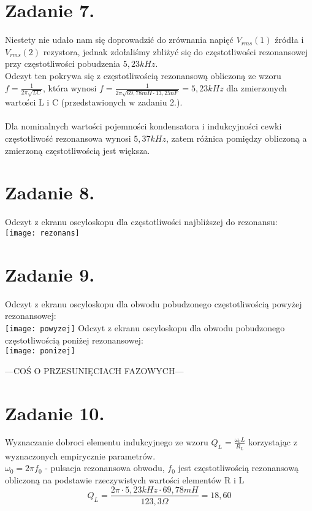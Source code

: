 \documentclass[polish,a4paper]{article}
\begin{document}
\section{Zadanie 7.}
Niestety nie udało nam się doprowadzić do zrównania napięć $V_{rms}(1)$ źródła i $V_{rms}(2)$ rezystora, jednak zdołaliśmy zbliżyć się do częstotliwości rezonansowej przy częstotliwości pobudzenia $5,23kHz$.\\
Odczyt ten pokrywa się z częstotliwością rezonansową obliczoną ze wzoru $f=\frac{1}{2\pi\sqrt{LC}}$, która wynosi $f=\frac{1}{2\pi\sqrt{69,78mH\cdot13,25nF}} = 5,23kHz$ dla zmierzonych wartości L i C (przedstawionych w zadaniu 2.). \\
\\Dla nominalnych wartości pojemności kondensatora i indukcyjności cewki częstotliwość rezonansowa wynosi $5,37kHz$, zatem różnica pomiędzy obliczoną a zmierzoną częstotliwością jest większa.

\section{Zadanie 8.}
Odczyt z ekranu oscyloskopu dla częstotliwości najbliższej do rezonansu:\\
\texttt{[image: rezonans]}

\section{Zadanie 9.}
Odczyt z ekranu oscyloskopu dla obwodu pobudzonego częstotliwością powyżej rezonansowej:\\
\texttt{[image: powyzej]}
\newpage
Odczyt z ekranu oscyloskopu dla obwodu pobudzonego częstotliwością poniżej rezonansowej:\\
\texttt{[image: ponizej]}

---COŚ O PRZESUNIĘCIACH FAZOWYCH---

\section{Zadanie 10.}
Wyznaczanie dobroci elementu indukcyjnego ze wzoru $Q_{L} = \frac{\omega_{0}L}{R_{L}}$ korzystając z wyznaczonych empirycznie parametrów.\\
$\omega_{0}=2\pi f_{0}$ - pulsacja rezonansowa obwodu, $f_{0}$ jest częstotliwością rezonansową obliczoną na podstawie rzeczywistych wartości elementów R i L
$$
Q_{L} = \frac{2\pi\cdot5,23kHz\cdot69,78mH}{123,3\Omega} = 18,60
$$
\end{document}
